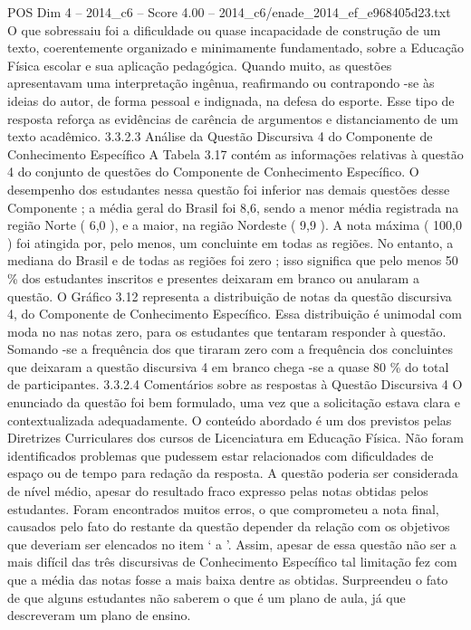 \begin{textsample}{POS Dim 4 – 2014\_c6 – Score 4.00 – 2014\_c6/enade\_2014\_ef\_e968405d23.txt}
O que sobressaiu foi a dificuldade ou quase incapacidade de construção de um texto, coerentemente organizado e minimamente fundamentado, sobre a Educação Física escolar e sua aplicação pedagógica.
Quando muito, as questões apresentavam uma interpretação ingênua, reafirmando ou contrapondo -se às ideias do autor, de forma pessoal e indignada, na defesa do esporte.
Esse tipo de resposta reforça as evidências de carência de argumentos e distanciamento de um texto acadêmico. 3.3.2.3 Análise da Questão Discursiva 4 do Componente de Conhecimento Específico A Tabela 3.17 contém as informações relativas à questão 4 do conjunto de questões do Componente de Conhecimento Específico.
O desempenho dos estudantes nessa questão foi inferior nas demais questões desse Componente ; a média geral do Brasil foi 8,6, sendo a menor média registrada na região Norte ( 6,0 ), e a maior, na região Nordeste ( 9,9 ).
A nota máxima ( 100,0 ) foi atingida por, pelo menos, um concluinte em todas as regiões.
No entanto, a mediana do Brasil e de todas as regiões foi zero ; isso significa que pelo menos 50 \% dos estudantes inscritos e presentes deixaram em branco ou anularam a questão.
O Gráfico 3.12 representa a distribuição de notas da questão discursiva 4, do Componente de Conhecimento Específico.
Essa distribuição é unimodal com moda no nas notas zero, para os estudantes que tentaram responder à questão.
Somando -se a frequência dos que tiraram zero com a frequência dos concluintes que deixaram a questão discursiva 4 em branco chega -se a quase 80 \% do total de participantes. 3.3.2.4 Comentários sobre as respostas à Questão Discursiva 4 O enunciado da questão foi bem formulado, uma vez que a solicitação estava clara e contextualizada adequadamente.
O conteúdo abordado é um dos previstos pelas Diretrizes Curriculares dos cursos de Licenciatura em Educação Física.
Não foram identificados problemas que pudessem estar relacionados com dificuldades de espaço ou de tempo para redação da resposta.
A questão poderia ser considerada de nível médio, apesar do resultado fraco expresso pelas notas obtidas pelos estudantes.
Foram encontrados muitos erros, o que comprometeu a nota final, causados pelo fato do restante da questão depender da relação com os objetivos que deveriam ser elencados no item ‘ a ’.
Assim, apesar de essa questão não ser a mais difícil das três discursivas de Conhecimento Específico tal limitação fez com que a média das notas fosse a mais baixa dentre as obtidas.
Surpreendeu o fato de que alguns estudantes não saberem o que é um plano de aula, já que descreveram um plano de ensino.

\end{textsample}
